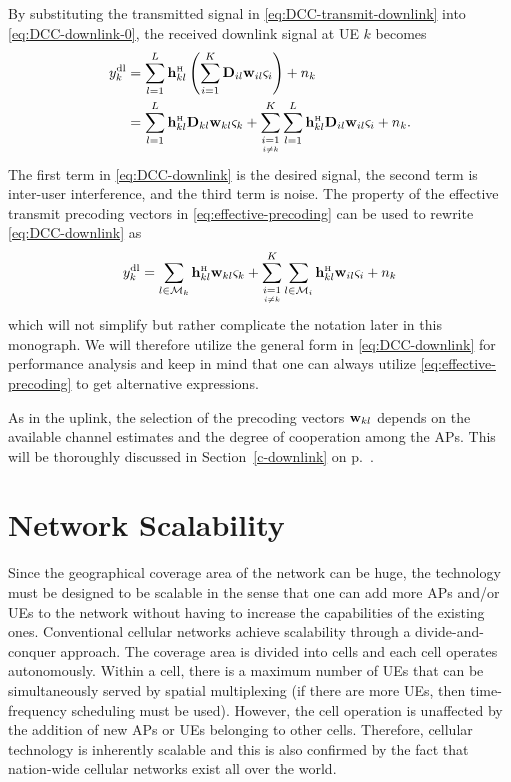 By substituting the transmitted signal in \eqref{eq:DCC-transmit-downlink} into \eqref{eq:DCC-downlink-0}, the received downlink signal at UE $k$ becomes
\begin{align} \notag
y_k^{\rm{dl}} & = \sum_{l=1}^{L}  \vect{h}_{kl}^{\Htran} \left( \sum_{i=1}^{K} \vect{D}_{il}  \vect{w}_{il} \varsigma_i \right)+ n_k \\&= \sum_{l=1}^{L}  \vect{h}_{kl}^{\Htran} \vect{D}_{kl}  \vect{w}_{kl} \varsigma_k + \condSum{i=1}{i \neq k}{K}  \sum_{l=1}^{L}  \vect{h}_{kl}^{\Htran}\vect{D}_{il}  \vect{w}_{il} \varsigma_i + n_k.\label{eq:DCC-downlink}
\end{align}
The first term in \eqref{eq:DCC-downlink} is the desired signal, the second term is inter-user interference, and the third term is noise. The property of the effective transmit precoding vectors in \eqref{eq:effective-precoding} can be used to rewrite \eqref{eq:DCC-downlink} as
\begin{align} 
y_k^{\rm{dl}} = \sum_{l \in \mathcal{M}_k}  \vect{h}_{kl}^{\Htran}  \vect{w}_{kl} \varsigma_k + \condSum{i=1}{i \neq k}{K}  \sum_{l \in \mathcal{M}_i}  \vect{h}_{kl}^{\Htran} \vect{w}_{il} \varsigma_i + n_k
\end{align}
which will not simplify but rather complicate the notation later in this monograph. We will therefore utilize the general form in \eqref{eq:DCC-downlink} for performance analysis and keep in mind that one can always utilize \eqref{eq:effective-precoding} to get alternative expressions.

As in the uplink, the selection of the precoding vectors $ \mathbf{w}_{kl}$ depends on the available channel estimates and the degree of cooperation among the \glspl{AP}. This will be thoroughly discussed in Section~\ref{c-downlink} on p.~\pageref{c-downlink}.


\section{Network Scalability}\label{sec:scalability}

Since the geographical coverage area of the network can be huge, the technology must be designed to be scalable in the sense that one can add more APs and/or UEs to the network without having to increase the capabilities of the existing ones.
Conventional cellular networks achieve scalability through a divide-and-conquer approach. The coverage area is divided into cells and each cell operates autonomously. Within a cell, there is a maximum number of UEs that can be simultaneously served by spatial multiplexing (if there are more UEs, then time-frequency scheduling must be used). However, the cell operation is unaffected by the addition of new APs or UEs belonging to other cells. Therefore, cellular technology is inherently scalable and this is also confirmed by the fact that nation-wide cellular networks exist all over the world.

